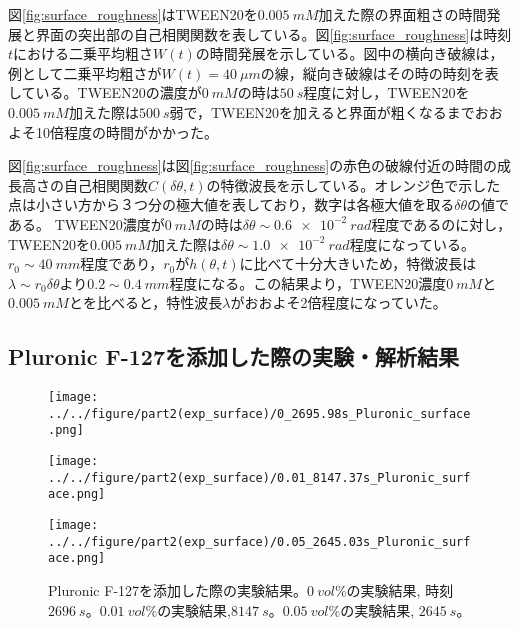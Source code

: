 \documentclass[autodetect-engine,dvi=dvipdfmx,a4paper,ja=standard,oneside,openany,11pt]{bxjsbook}
\begin{document}
図\ref{fig:surface_roughness}はTWEEN20を$\SI{0.005}{mM}$加えた際の界面粗さの時間発展と界面の突出部の自己相関関数を表している。図\ref{fig:surface_roughness}は時刻$t$における二乗平均粗さ$W(t)$の時間発展を示している。図中の横向き破線は，例として二乗平均粗さが$W(t)=\SI{40}{\mu m}$の線，縦向き破線はその時の時刻を表している。TWEEN20の濃度が$\SI{0}{mM}$の時は$\SI{50}{s}$程度に対し，TWEEN20を$\SI{0.005}{mM}$加えた際は$\SI{500}{s}$弱で，TWEEN20を加えると界面が粗くなるまでおおよそ10倍程度の時間がかかった。

図\ref{fig:surface_roughness}は図\ref{fig:surface_roughness}の赤色の破線付近の時間の成長高さの自己相関関数$C(\delta\theta,t)$の特徴波長を示している。オレンジ色で示した点は小さい方から３つ分の極大値を表しており，数字は各極大値を取る$\delta \theta$の値である。
TWEEN20濃度が$\SI{0}{mM}$の時は$\delta\theta\sim\SI{0.6e-2}{rad}$程度であるのに対し，TWEEN20を$\SI{0.005}{mM}$加えた際は$\delta\theta\sim\SI{1.0e-2}{rad}$程度になっている。$r_0\sim\SI{40}{mm}$程度であり，$r_0$が$h(\theta,t)$に比べて十分大きいため，特徴波長は$\lambda\sim r_0\delta\theta$より$0.2\sim\SI{0.4}{mm}$程度になる。この結果より，TWEEN20濃度$\SI{0}{mM}$と$\SI{0.005}{mM}$とを比べると，特性波長$\lambda$がおおよそ2倍程度になっていた。

\subsection{Pluronic F-127を添加した際の実験・解析結果}
\begin{figure}[htbp]
  \begin{minipage}
    {0.32\textwidth}
    \subcaption{}
    \centering
    \texttt{[image: ../../figure/part2(exp\_surface)/0\_2695.98s\_Pluronic\_surface.png]}
    \label{fig:0_2695.98 s_Pluronic_surface}
  \end{minipage}
  \begin{minipage}
    {0.32\textwidth}
    \subcaption{}
    \centering
    \texttt{[image: ../../figure/part2(exp\_surface)/0.01\_8147.37s\_Pluronic\_surface.png]}
    \label{fig:0.01_8147.37 s_Pluronic_surface}
  \end{minipage}
  \begin{minipage}
    {0.32\textwidth}
    \subcaption{}
    \centering
    \texttt{[image: ../../figure/part2(exp\_surface)/0.05\_2645.03s\_Pluronic\_surface.png]}
    \label{fig:0.05_2645.03 s_Pluronic_surface}
  \end{minipage}
  \caption{Pluronic F-127を添加した際の実験結果。$\SI{0}{vol\%}$の実験結果, 時刻$\SI{2696}{s}$。$\SI{0.01}{vol\%}$の実験結果,$\SI{8147}{s}$。$\SI{0.05}{vol\%}$の実験結果, $\SI{2645}{s}$。}
  \label{fig:Pluronic_surface}
\end{figure}
\end{document}
